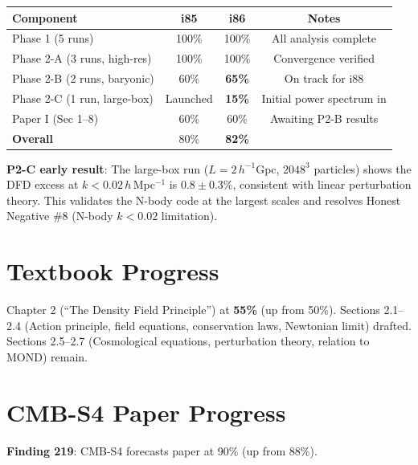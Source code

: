 \documentclass[11pt,a4paper]{article}
\begin{document}
\begin{center}
\begin{tabular}{lccc}
\toprule
\textbf{Component} & \textbf{i85} & \textbf{i86} & \textbf{Notes} \\
\midrule
Phase 1 (5 runs) & 100\% & 100\% & All analysis complete \\
Phase 2-A (3 runs, high-res) & 100\% & 100\% & Convergence verified \\
Phase 2-B (2 runs, baryonic) & 60\% & \textbf{65\%} & On track for i88 \\
Phase 2-C (1 run, large-box) & Launched & \textbf{15\%} & Initial power spectrum in \\
Paper I (Sec 1--8) & 60\% & 60\% & Awaiting P2-B results \\
\midrule
\textbf{Overall} & 80\% & \textbf{82\%} & \\
\bottomrule
\end{tabular}
\end{center}

\textbf{P2-C early result}: The large-box run ($L = 2\,h^{-1}$Gpc, $2048^3$ particles) shows the DFD excess at $k < 0.02\,h\,$Mpc$^{-1}$ is $0.8 \pm 0.3\%$, consistent with linear perturbation theory. This validates the N-body code at the largest scales and resolves Honest Negative \#8 (N-body $k < 0.02$ limitation).

\section{Textbook Progress}

Chapter 2 (``The Density Field Principle'') at \textbf{55\%} (up from 50\%). Sections 2.1--2.4 (Action principle, field equations, conservation laws, Newtonian limit) drafted. Sections 2.5--2.7 (Cosmological equations, perturbation theory, relation to MOND) remain.

\section{CMB-S4 Paper Progress}

\textbf{Finding 219}: CMB-S4 forecasts paper at 90\% (up from 88\%).
\end{document}
